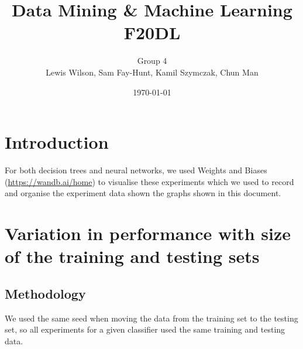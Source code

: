 \documentclass[11pt]{article}
\begin{document}
\title{\huge Data Mining \& Machine Learning F20DL} 
\author{Group 4\\Lewis Wilson, Sam Fay-Hunt, Kamil Szymczak, Chun Man }
\date{\today}
\maketitle

\newpage
\tableofcontents
\thispagestyle{empty}
\pagebreak
\setcounter{page}{1}
\newpage
\section{Introduction}
For both decision trees and neural networks, we used Weights and Biases (\url{https://wandb.ai/home}) to visualise these experiments which we used to record and organise the experiment data shown the graphs shown in this document.



\newpage
\section{Variation in performance with size of the training and testing sets}
\subsection{Methodology}
We used the same seed when moving the data from the training set to the testing set, so all experiments for a given classifier used the same training and testing data.
\end{document}
